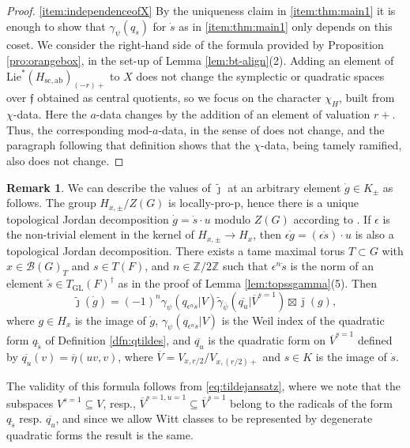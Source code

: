 \documentclass{article}
\def\mc#1{\mathcal{#1}}
\def\Z{\mathbb{Z}}
\def\ol#1{\overline{#1}}
\DeclareMathOperator{\GL}{GL}
\theoremstyle{definition}
\newtheorem{rem}[thm]{Remark}
\numberwithin{equation}{subsection}
\renewcommand{\-}{\hyp{}}
\newcommand{\rf}{\mathfrak{f}}
\newcommand{\oV}{\ol{V}}
\begin{document}
\begin{proof}
	\ref{item:independenceofX} By the uniqueness claim in \ref{item:thm:main1} it is enough to show that $\gamma_\psi(q_{\dot s})$ for $\dot s$ as in \ref{item:thm:main1} only depends on this coset. We consider the right-hand side of the formula provided by Proposition \ref{pro:orangebox}, in the set-up of Lemma \ref{lem:bt-align}(2). Adding an element of $\mathrm{Lie}^*(H_\mathrm{sc,ab})_{(-r)+}$ to $X$ does not change the symplectic or quadratic spaces over $\rf$ obtained as central quotients, so we focus on the character $\chi_H$, built from $\chi$-data. Here the $a$-data changes by the addition of an element of valuation $r+$. Thus, the corresponding mod-$a$-data, in the sense of \cite[Definition 4.6.8]{KalRSP} does not change, and the paragraph following that definition shows that the $\chi$-data, being tamely ramified, also does not change.
\end{proof}

\begin{rem} \label{rem:jvalues}
	We can describe the values of $\tilde\jmath$ at an arbitrary element $\dot g \in K_\pm$ as follows. The group $H_{x,\pm}/Z(G)$ is locally-pro-p, hence there is a unique topological Jordan decomposition $\dot g=\dot s \cdot u$ modulo $Z(G)$ according to \cite[Propositions 1.7, 1.8]{Spice08}. If $\epsilon$ is the non-trivial element in the kernel of $H_{x,\pm} \to H_x$, then $\epsilon \dot g = (\epsilon\dot s) \cdot u$ is also a topological Jordan decomposition. There exists a tame maximal torus $T \subset G$ with $x \in \mc{B}(G)_T$ and $s \in T(F)$, and $n \in \Z/2\Z$ such that $\epsilon^n \dot s$ is the norm of an element $\tilde s \in T_{\GL}(F)^\dagger$ as in the proof of Lemma \ref{lem:topssgamma}(5). Then 
	\begin{equation}
		\tilde\jmath(\dot g)=(-1)^n\gamma_\psi(q_{\epsilon^n\dot s}|V)\tilde\gamma_{\bar\psi}(\overline{q_u}|\oV^{s=1}) \boxtimes \bar\jmath(g),
	\end{equation}
	where $g \in H_x$ is the image of $\dot g$, $\gamma_\psi(q_{\epsilon^n\dot s}|V)$ is the Weil index of the quadratic form $q_{\tilde s}$ of Definition \ref{dfn:qtildes}, and $\overline{q_u}$ is the quadratic form on $\oV^{s=1}$ defined by $\ol{q_u}(v)=\ol{\eta}(uv,v)$, where $\oV = V_{x,r/2}/V_{x,(r/2)+}$ and $s \in K$ is the image of $\dot s$. 

	The validity of this formula follows from \eqref{eq:tildejansatz}, where we note that the subspaces $V^{s=1} \subseteq V$, resp., $\oV^{s=1,u=1} \subseteq \oV^{s=1}$ belong to the radicals of the form $q_{\tilde s}$ resp. $\ol{q_u}$, and since we allow Witt classes to be represented by degenerate quadratic forms the result is the same.

\end{rem}
\end{document}
